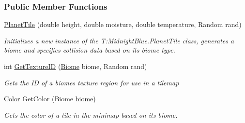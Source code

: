 \subsubsection*{Public Member Functions}
\begin{DoxyCompactItemize}
\item 
\hyperlink{class_midnight_blue_1_1_planet_tile_aa8fd125394504682bd0c2f2d9d28622b}{Planet\+Tile} (double height, double moisture, double temperature, Random rand)
\begin{DoxyCompactList}\small\item\em Initializes a new instance of the T\+:\+Midnight\+Blue.\+Planet\+Tile class, generates a biome and specifies collision data based on its biome type. \end{DoxyCompactList}\item 
int \hyperlink{class_midnight_blue_1_1_planet_tile_a0ba5d9886790e8f8d9e54e1873d5565b}{Get\+Texture\+ID} (\hyperlink{namespace_midnight_blue_a8a6ba5637b64c3eb991f00d48decf381}{Biome} biome, Random rand)
\begin{DoxyCompactList}\small\item\em Gets the ID of a biomes texture region for use in a tilemap \end{DoxyCompactList}\item 
Color \hyperlink{class_midnight_blue_1_1_planet_tile_a0efc70f73aaf5a252cfe6b96deb9aa22}{Get\+Color} (\hyperlink{namespace_midnight_blue_a8a6ba5637b64c3eb991f00d48decf381}{Biome} biome)
\begin{DoxyCompactList}\small\item\em Gets the color of a tile in the minimap based on its biome. \end{DoxyCompactList}\end{DoxyCompactItemize}
